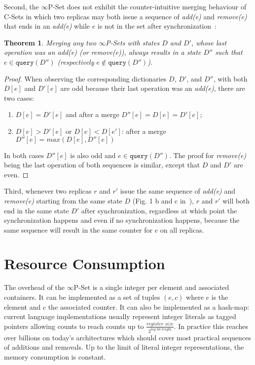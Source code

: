 \documentclass[11pt, oneside]{article}   	%
\newtheorem{theorem}{Theorem}
\begin{document}
Second,  the $\infty$P-Set does not exhibit the counter-intuitive merging behaviour of C-Sets in which two replicas may both issue a sequence of \textit{add(e)} and \textit{remove(e)} that ends in an \textit{add(e)} while $e$ is not in the set after synchronization~\cite{bieniusa:hal-00769554}:

\begin{theorem}
Merging any two $\infty$P-Sets with states $D$ and $D'$, whose last operation was an \textit{add(e)} (or \textit{remove(e)}), always results in a state $D''$ such that $e \in \texttt{query}(D'')$ (respectively $e \notin \texttt{query}(D'')$).
\end{theorem}

\begin{proof}
When observing the corresponding dictionaries $D$, $D'$, and $D''$, with both $D[e]$ and $D'[e]$ are odd because their last operation was an \textit{add(e)}, there are two cases:
\begin{enumerate}
    \item $D[e]=D'[e]$ and after a merge $D''[e]=D[e]=D'[e]$;
    \item $D[e]>D'[e]$ or $D[e]<D[e']$: after a merge $D''[e]=max(D[e], D''[e])$
\end{enumerate}   

In both cases $D''[e]$ is also odd and $e \in  \texttt{query}(D'')$.  The proof for \textit{remove(e)} being the last operation of both sequences is similar, except that $D$ and $D'$ are even.
\end{proof}

Third, whenever two replicas $r$ and $r'$ issue the same sequence of \textit{add(e)} and \textit{remove(e)} starting from the same state $D$ (Fig. 1 b and c in~\cite{bieniusa:hal-00769554}), $r$ and $r'$ will both end in the same state $D'$ after synchronization, regardless at which point the synchronization happens and even if no synchronization happens, because the same sequence will result in the same counter for $e$ on all replicas.

\section{Resource Consumption}
\label{sec:resource-consumption}

The overhead of the $\infty$P-Set is a single integer per element and associated containers. It can be implemented as a set of tuples $(e,c)$ where $e$ is the element and $c$ the associated counter. It can also be implemented as a hash-map: current language implementations usually represent integer literals as tagged pointers allowing counts to reach counts up to 
$\frac{\textit{register size}}{2^\textit{tag bit-length}}$. In practice this reaches over billions on today's architectures which should cover most practical sequences of additions and removals. Up to the limit of literal integer representations, the memory consumption is constant.
\end{document}
